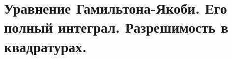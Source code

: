 \section{Уравнение Гамильтона-Якоби. Его полный интеграл. Разрешимость в квадратурах.}\label{chasec22}



\newpage